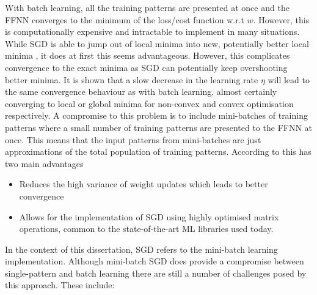 With batch learning, all the training patterns are presented at once and the \ac{FFNN} converges to the minimum of the loss/cost function w.r.t $w$. However, this is computationally expensive and intractable to implement in many situations. While \ac{SGD} is able to jump out of local minima into new, potentially better local minima \cite{ref:ruder:2016}, it does at first this seems advantageous. However, this complicates convergence to the exact minima as \ac{SGD} can potentially keep overshooting better minima. It is shown that a slow decrease in the learning rate $\eta$ will lead to the same convergence behaviour as with batch learning, almost certainly converging to local or global minima for non-convex and convex optimisation respectively. A compromise to this problem is to include mini-batches of training patterns where a small number of training patterns are presented to the \ac{FFNN} at once. This means that the input patterns from mini-batches are just approximations of the total population of training patterns. According to \citeauthor{ref:ruder:2016} \cite{ref:ruder:2016} this has two main advantages

\begin{itemize}
    \item Reduces the high variance of weight updates which leads to better convergence
    \item Allows for the implementation of \ac{SGD} using highly optimised matrix operations, common to the state-of-the-art \ac{ML} libraries used today.
\end{itemize}

In the context of this dissertation, \ac{SGD} refers to the mini-batch learning implementation. Although mini-batch \ac{SGD} does provide a compromise between single-pattern and batch learning there are still a number of challenges posed by this approach. These include:

